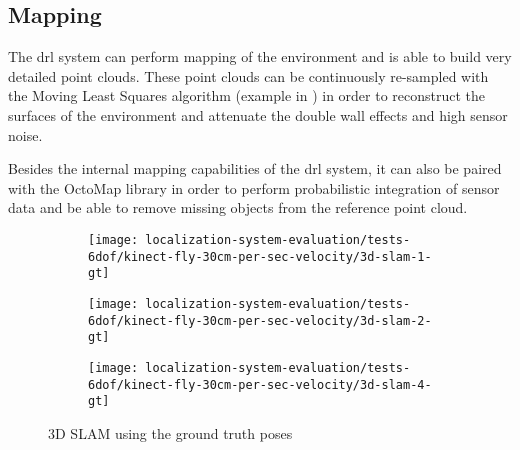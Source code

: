 \subsection{Mapping}

The \gls{drl} system can perform mapping of the environment and is able to build very detailed point clouds. These point clouds can be continuously re-sampled with the Moving Least Squares algorithm (example in ) in order to reconstruct the surfaces of the environment and attenuate the double wall effects and high sensor noise.

Besides the internal mapping capabilities of the \gls{drl} system, it can also be paired with the OctoMap \cite{Hornung2013} library in order to perform probabilistic integration of sensor data and be able to remove missing objects from the reference point cloud.


\begin{figure}[H]
	\centering
	\begin{subfigure}[ht]{0.4\textwidth}
		\centering
		\texttt{[image: localization-system-evaluation/tests-6dof/kinect-fly-30cm-per-sec-velocity/3d-slam-1-gt]}
	\end{subfigure}
	\begin{subfigure}[ht]{0.4\textwidth}
		\centering
		\texttt{[image: localization-system-evaluation/tests-6dof/kinect-fly-30cm-per-sec-velocity/3d-slam-2-gt]}
	\end{subfigure}
	\begin{subfigure}[ht]{0.4\textwidth}
		\centering
		\texttt{[image: localization-system-evaluation/tests-6dof/kinect-fly-30cm-per-sec-velocity/3d-slam-4-gt]}
	\end{subfigure}
	\caption{3D SLAM using the ground truth poses}
	\label{fig:localization-system-evaluation_kinect-fly-30cm-per-sec-velocity-gt-slam}
\end{figure}


